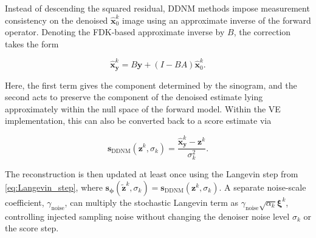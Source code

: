 Instead of descending the squared residual, DDNM methods \cite{wang_zero-shot_2022-1} impose measurement consistency on the denoised $\hat {\mathbf{x}}_0^k$ image using an approximate inverse of the forward operator. Denoting the FDK-based approximate inverse by $B$, the correction takes the form

\begin{equation}
\hat{\mathbf{x}}_{\mathbf{y}}^k
=
B\mathbf{y}
+
(I-BA)\hat{\mathbf{x}}_0^k.
\label{eq:ddnm_measurement_consistency}
\end{equation}

Here, the first term gives the component determined by the sinogram, and the second acts to preserve the component of the denoised estimate lying approximately within the null space of the forward model. Within the VE implementation, this can also be converted back to a score estimate via

\begin{equation}
\mathbf{s}_{\mathrm{DDNM}}(\mathbf{z}^k,\sigma_k)
=
\frac{
\hat{\mathbf{x}}_{\mathbf{y}}^k-\mathbf{z}^k
}{\sigma_k^2}.
\label{eq:ddnm_score_estimate}
\end{equation}

The reconstruction is then updated at least once using the Langevin step from \eqref{eq:Langevin_step}, where $\mathbf{s}_{\boldsymbol{\phi}}(\tilde{\mathbf{z}}^k,\sigma_k)=\mathbf{s}_{\mathrm{DDNM}}(\mathbf{z}^k,\sigma_k)$. A separate noise-scale coefficient, $\gamma_{\mathrm{noise}}$, can multiply the stochastic Langevin term as $\gamma_{\mathrm{noise}}\sqrt{\alpha_k}\boldsymbol{\xi}^k$, controlling injected sampling noise without changing the denoiser noise level $\sigma_k$ or the score step.
